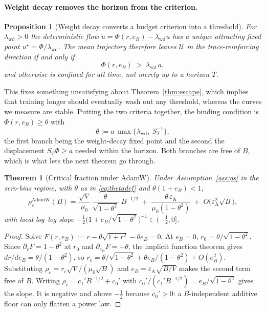\documentclass{article}
\theoremstyle{plain}
\newtheorem{theorem}{Theorem}
\newtheorem{proposition}{Proposition}
\theoremstyle{definition}
\theoremstyle{remark}
\newcommand{\1}{\mathbf{1}}
\newcommand{\cU}{\mathcal{U}}
\newcommand{\wdc}{\mathrm{wd}}
\newcommand{\Adam}{\mathrm{AdamW}}
\begin{document}
\paragraph{Weight decay removes the horizon from the criterion.}
\begin{proposition}[Weight decay converts a budget criterion into a threshold]
\label{prop:wd}
For $\lambda_\wdc > 0$ the deterministic flow
$\dot u = \Phi(r,e_B)-\lambda_\wdc u$ has a unique attracting fixed point
$u^\star = \Phi/\lambda_\wdc$. The mean trajectory therefore leaves $\cU$ in the
trace-reinforcing direction if and only if
\begin{equation}
\label{eq:wdcriterion}
\Phi(r,e_B) \;>\; \lambda_\wdc\,a ,
\end{equation}
and otherwise is confined for all time, not merely up to a horizon $T$.
\end{proposition}

This fixes something unsatisfying about Theorem~\ref{thm:escape}, which implies
that training longer should eventually wash out any threshold, whereas the curves
we measure are stable. Putting the two criteria together, the binding condition
is $\Phi(r,e_B)\ge\theta$ with
\begin{equation}
\label{eq:thetadef}
\theta := a\,\max\{\lambda_\wdc,\ S_T^{-1}\},
\end{equation}
the first branch being the weight-decay fixed point and the second the
displacement $S_T\Phi\ge a$ needed within the horizon. Both branches are free of
$B$, which is what lets the next theorem go through.

\begin{theorem}[Critical fraction under AdamW]
\label{thm:adamthreshold}
Under Assumption~\ref{ass:qs} in the zero-bias regime, with $\theta$ as in
\eqref{eq:thetadef} and $\theta(1+e_B) < 1$,
\begin{equation}
\label{eq:adamrhoc}
\rho_c^{\Adam}(B)
= \frac{\sqrt V}{\mu_0}\,\frac{\theta}{\sqrt{1-\theta^2}}\;B^{-1/2}
\;+\; \frac{\theta\,\varepsilon_{\mathrm A}}{\mu_0(1-\theta^2)}
\;+\; O\big(\varepsilon_{\mathrm A}^2\sqrt B\big),
\end{equation}
with local log--log slope
$-\tfrac12\big(1+e_B/\sqrt{1-\theta^2}\big)^{-1} \in (-\tfrac12,0]$.
\end{theorem}

\begin{proof}
Solve $F(r,e_B) := r-\theta\sqrt{1+r^2}-\theta e_B = 0$. At $e_B = 0$,
$r_0 = \theta/\sqrt{1-\theta^2}$. Since $\partial_rF = 1-\theta^2$ at $r_0$ and
$\partial_{e_B}F = -\theta$, the implicit function theorem gives
$dr/de_B = \theta/(1-\theta^2)$, so
$r_c = \theta/\sqrt{1-\theta^2}+\theta e_B/(1-\theta^2)+O(e_B^2)$. Substituting
$\rho_c = r_c\sqrt V/(\mu_0\sqrt B)$ and
$e_B = \varepsilon_{\mathrm A}\sqrt{B/V}$ makes the second term free of $B$.
Writing $\rho_c = c_1'B^{-1/2}+c_0'$ with
$c_0'/(c_1'B^{-1/2}) = e_B/\sqrt{1-\theta^2}$ gives the slope. It is negative and
above $-\tfrac12$ because $c_0'>0$: a $B$-independent additive floor can only
flatten a power law.
\end{proof}
\end{document}

